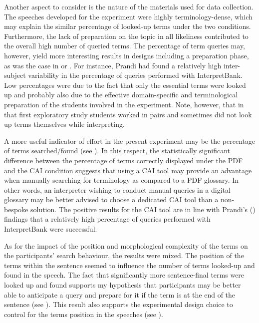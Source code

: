 Another aspect to consider is the nature of the materials used for data collection. The speeches developed for the experiment were highly terminology-dense, which may explain the similar percentage of looked-up terms under the two conditions. Furthermore, the lack of preparation on the topic in all likeliness contributed to the overall high number of queried terms. The percentage of term queries may, however, yield more interesting results in designs including a preparation phase, as was the case in \citet{biagini_glossario_2015} or \citet{prandi_uso_2015, prandi_use_2015}. For instance, Prandi had found a relatively high inter-subject variability in the percentage of queries performed with InterpretBank. Low percentages were due to the fact that only the essential terms were looked up and probably also due to the effective domain-specific and terminological preparation of the students involved in the experiment. Note, however, that in that first exploratory study students worked in pairs and sometimes did not look up terms themselves while interpreting.

A more useful indicator of effort in the present experiment may be the percentage of terms searched/found (see ). In this respect, the statistically significant difference between the percentage of terms correctly displayed under the PDF and the CAI condition suggests that using a CAI tool may provide an advantage when manually searching for terminology as compared to a PDF glossary. In other words, an interpreter wishing to conduct manual queries in a digital glossary may be better advised to choose a dedicated CAI tool than a non-bespoke solution. The positive results for the CAI tool are in line with Prandi's (\citeyear{prandi_uso_2015, prandi_use_2015}) findings that a relatively high percentage of queries performed with InterpretBank were successful.

As for the impact of the position and morphological complexity of the terms on the participants' search behaviour, the results were mixed.
The position of the terms within the sentence seemed to influence the number of terms looked-up and found in the speech. The fact that significantly more sentence-final terms were looked up and found supports my hypothesis that participants may be better able to anticipate a query and prepare for it if the term is at the end of the sentence (see ). This result also supports the experimental design choice to control for the terms position in the speeches (see ).

